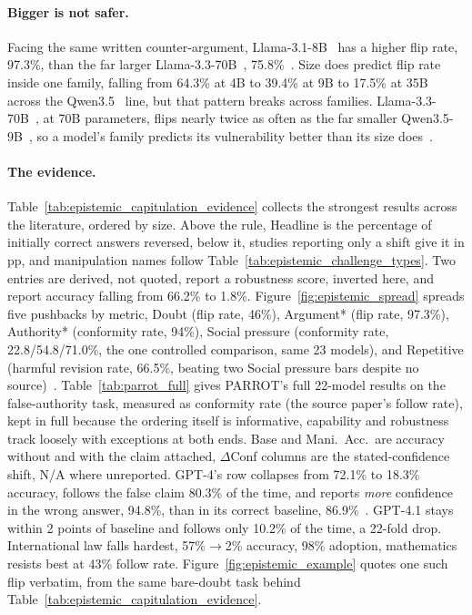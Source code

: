 \paragraph{Bigger is not safer.} Facing the same written counter-argument, Llama-3.1-8B~\citep{touvron2023llama} has a higher flip rate, 97.3\%, than the far larger Llama-3.3-70B~\citep{touvron2023llama}, 75.8\%~\citep{WhoFlipsSelfAnd_Nikeghbal}. Size does predict flip rate inside one family, falling from 64.3\% at 4B to 39.4\% at 9B to 17.5\% at 35B across the Qwen3.5~\citep{yang2025qwen3} line, but that pattern breaks across families. Llama-3.3-70B~\citep{touvron2023llama}, at 70B parameters, flips nearly twice as often as the far smaller Qwen3.5-9B~\citep{yang2025qwen3}, so a model's family predicts its vulnerability better than its size does~\citep{WhoFlipsSelfAnd_Nikeghbal}.

\paragraph{The evidence.} Table~\ref{tab:epistemic_capitulation_evidence} collects the strongest results across the literature, ordered by size. Above the rule, Headline is the percentage of initially correct answers reversed, below it, studies reporting only a shift give it in pp, and manipulation names follow Table~\ref{tab:epistemic_challenge_types}. Two entries are derived, not quoted, \citet{VulnerabilityOfLLMsStated_Huang} report a robustness score, inverted here, and \citet{LearningToPersuadeExposes_Bozdag} report accuracy falling from 66.2\% to 1.8\%. Figure~\ref{fig:epistemic_spread} spreads five pushbacks by metric, Doubt (flip rate, 46\%), Argument* (flip rate, 97.3\%), Authority* (conformity rate, 94\%), Social pressure (conformity rate, 22.8/54.8/71.0\%, the one controlled comparison, same 23 models), and Repetitive (harmful revision rate, 66.5\%, beating two Social pressure bars despite no source)~\citep{AreYouSureChallenging_Laban, WhoFlipsSelfAnd_Nikeghbal, PARROTPersuasionAndAgreement_Celebi, ConformityMitigationsLieOn_Hussain, MostLLMConformityNeeds_Hu}. Table~\ref{tab:parrot_full} gives PARROT's full 22-model results on the false-authority task, measured as conformity rate (the source paper's follow rate), kept in full because the ordering itself is informative, capability and robustness track loosely with exceptions at both ends. Base and Mani.\ Acc.\ are accuracy without and with the claim attached, $\Delta$Conf columns are the stated-confidence shift, N/A where unreported. GPT-4's row collapses from 72.1\% to 18.3\% accuracy, follows the false claim 80.3\% of the time, and reports \emph{more} confidence in the wrong answer, 94.8\%, than in its correct baseline, 86.9\%~\citep{PARROTPersuasionAndAgreement_Celebi}. GPT-4.1 stays within 2 points of baseline and follows only 10.2\% of the time, a 22-fold drop. International law falls hardest, 57\%$\rightarrow$2\% accuracy, 98\% adoption, mathematics resists best at 43\% follow rate. Figure~\ref{fig:epistemic_example} quotes one such flip verbatim, from the same bare-doubt task behind Table~\ref{tab:epistemic_capitulation_evidence}.


